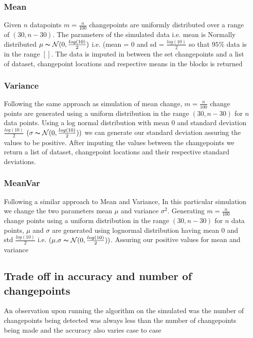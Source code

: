 \documentclass{article}
\begin{document}
\subsubsection{Mean}
Given $n$ datapoints $m = \frac{n}{100}$ changepoints are uniformly distributed over a range of $(30,n-30)$.  
The parameters of the simulated data i.e. mean is Normally distributed $\mu \thicksim \mathcal{N}(0,\frac{log(10)}{2})$ i.e. (mean = 0 and sd = $\frac{log(10)}{2}$ so that $95\%$ data is in the range $[]$. The data is imputed in between the set changepoints and a list of dataset, changepoint locations and respective means in the blocks is returned 
\subsubsection{Variance}
Following the same approach as simulation of mean change, $m = \frac{n}{100}$ change points are generated using a uniform distribution in the range $(30,n-30)$ for $n$ data points. Using a log normal distribution with mean 0 and standard deviation $\frac{log(10)}{2}$ $(\sigma \thicksim \mathcal{N}(0,\frac{log(10)}{2}))$ we can generate our standard deviation assuring the values to be positive. After imputing the values between the changepoints we return a list of dataset, changepoint locations and their respective standard deviations. 

\subsubsection{MeanVar}
Following a similar approach to Mean and Variance, In this particular simulation we change the two parameters mean $\mu$ and variance $\sigma^{2}$. Generating $m = \frac{n}{100}$ change points using a uniform distribution in the range $(30,n-30)$ for $n$ data points, $\mu$ and $\sigma$ are generated using lognormal distribution having mean 0 and std $\frac{log(10)}{2}$ i.e. $(\mu. \sigma \thicksim \mathcal{N}(0,\frac{log(10)}{2}))$. Assuring our positive values for mean and variance 


\subsection{Trade off in accuracy and number of changepoints}
An observation upon running the algorithm on the simulated was the number of changepoints being detected was always less than the number of changepoints being made and the accuracy also varies case to case


\end{document}
